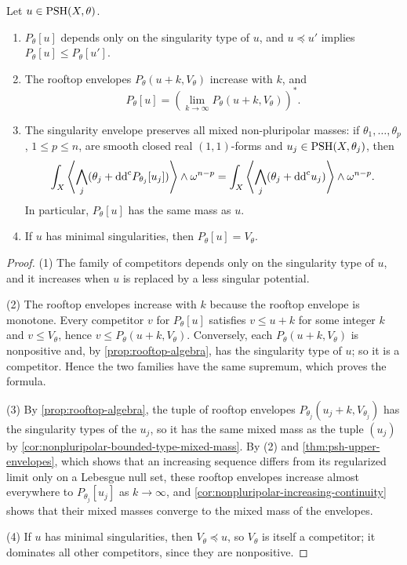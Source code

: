 \begin{proposition}\label{prop:p-envelope-calculus}
Let $u\in\mathrm{PSH}(X,\theta)$.
\begin{enumerate}
 \item $P_\theta[u]$ depends only on the singularity type of $u$, and $u\preceq u'$ implies $P_\theta[u]\leq P_\theta[u']$.
 \item The rooftop envelopes $P_\theta(u+k,V_\theta)$ increase with $k$, and
 \[
  P_\theta[u]=\left(\lim_{k\to\infty}
                         P_\theta(u+k,V_\theta)\right)^*.
 \]
 \item The singularity envelope preserves all mixed non-pluripolar masses: if $\theta_1,\ldots,\theta_p$, $1\leq p\leq n$, are smooth closed real $(1,1)$-forms and $u_j\in\mathrm{PSH}(X,\theta_j)$, then
 \[
  \int_X\left\langle\bigwedge_j(\theta_j+\mathrm{dd}^{\mathrm{c}} P_{\theta_j}[u_j])\right\rangle
                                       \wedge\omega^{n-p}
  =\int_X\left\langle\bigwedge_j(\theta_j+\mathrm{dd}^{\mathrm{c}} u_j)\right\rangle
                                       \wedge\omega^{n-p}.
 \]
 In particular, $P_\theta[u]$ has the same mass as $u$.
 \item If $u$ has minimal singularities, then $P_\theta[u]=V_\theta$.
\end{enumerate}
\end{proposition}
\begin{proof}
(1) The family of competitors depends only on the singularity type of $u$, and it increases when $u$ is replaced by a less singular potential.

(2) The rooftop envelopes increase with $k$ because the rooftop envelope is monotone. Every competitor $v$ for $P_\theta[u]$ satisfies $v\leq u+k$ for some integer $k$ and $v\leq V_\theta$, hence $v\leq P_\theta(u+k,V_\theta)$. Conversely, each $P_\theta(u+k,V_\theta)$ is nonpositive and, by \cref{prop:rooftop-algebra}, has the singularity type of $u$; so it is a competitor. Hence the two families have the same supremum, which proves the formula.

(3) By \cref{prop:rooftop-algebra}, the tuple of rooftop envelopes $P_{\theta_j}(u_j+k,V_{\theta_j})$ has the singularity types of the $u_j$, so it has the same mixed mass as the tuple $(u_j)$ by \cref{cor:nonpluripolar-bounded-type-mixed-mass}. By (2) and \cref{thm:psh-upper-envelopes}, which shows that an increasing sequence differs from its regularized limit only on a Lebesgue null set, these rooftop envelopes increase almost everywhere to $P_{\theta_j}[u_j]$ as $k\to\infty$, and \cref{cor:nonpluripolar-increasing-continuity} shows that their mixed masses converge to the mixed mass of the envelopes.

(4) If $u$ has minimal singularities, then $V_\theta\preceq u$, so $V_\theta$ is itself a competitor; it dominates all other competitors, since they are nonpositive.
\end{proof}

